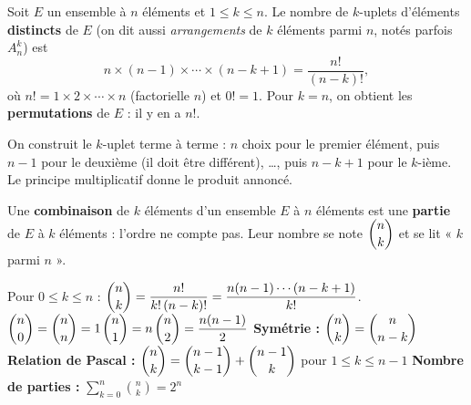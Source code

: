 
\begin{theoreme}
Soit $E$ un ensemble à $n$ éléments et $1\leq k\leq n$. Le nombre de $k$-uplets d'éléments \textbf{distincts} de $E$ (on dit aussi
\emph{arrangements} de $k$ éléments parmi $n$, notés parfois $A_n^k$) est
\[ n\times(n-1)\times\cdots\times(n-k+1)=\frac{n!}{(n-k)!}, \]
où $n!=1\times2\times\cdots\times n$ (factorielle $n$) et $0!=1$. Pour $k=n$, on obtient les \textbf{permutations} de $E$ : il y en a $n!$.
\end{theoreme}

\begin{demonstration}
On construit le $k$-uplet terme à terme : $n$ choix pour le premier élément, puis $n-1$ pour le deuxième (il doit être différent),
\dots, puis $n-k+1$ pour le $k$-ième. Le principe multiplicatif donne le produit annoncé.
\end{demonstration}


\begin{definition}[Combinaison]
Une \textbf{combinaison} de $k$ éléments d'un ensemble $E$ à $n$ éléments est une \textbf{partie} de $E$ à $k$ éléments : l'ordre
ne compte pas. Leur nombre se note $\dbinom nk$ et se lit « $k$ parmi $n$ ».
\end{definition}

\begin{theoreme}
Pour $0\leq k\leq n$ : \quad $\dbinom nk=\dfrac{n!}{k!\,(n-k)!}=\dfrac{n(n-1)\cdots(n-k+1)}{k!}$.\\[2mm]
$\dbinom n0=\dbinom nn=1$\qquad $\dbinom n1=n$\qquad $\dbinom n2=\dfrac{n(n-1)}{2}$\qquad
\textbf{Symétrie :} $\dbinom nk=\dbinom n{n-k}$\\[2mm]
\textbf{Relation de Pascal :} $\dbinom nk=\dbinom{n-1}{k-1}+\dbinom{n-1}{k}$ pour $1\leq k\leq n-1$\qquad
\textbf{Nombre de parties :} $\displaystyle\sum_{k=0}^{n}\binom nk=2^{n}$
\end{theoreme}

